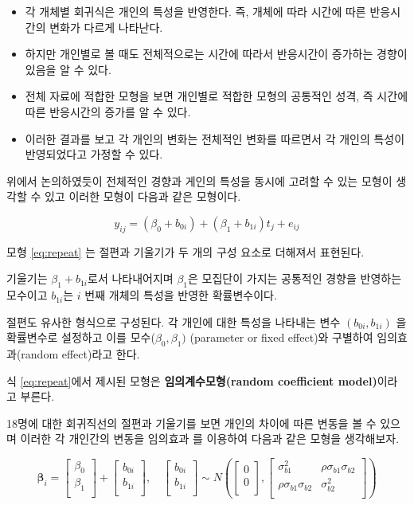 \documentclass[
]{book}
\providecommand{\tightlist}{%
  \setlength{\itemsep}{0pt}\setlength{\parskip}{0pt}}
\newcommand{\bm}[1]{ \symbf{#1}}
\begin{document}
\begin{itemize}
\tightlist
\item
  각 개체별 회귀식은 개인의 특성을 반영한다. 즉, 개체에 따라 시간에 따른 반응시간의 변화가 다르게 나타난다.
\item
  하지만 개인별로 볼 때도 전체적으로는 시간에 따라서 반응시간이 증가하는 경향이 있음을 알 수 있다.
\item
  전체 자료에 적합한 모형을 보면 개인별로 적합한 모형의 공통적인 성격, 즉 시간에 따른 반응시간의 증가를 알 수 있다.
\item
  이러한 결과를 보고 각 개인의 변화는 전체적인 변화를 따르면서 각 개인의 특성이 반영되었다고 가정할 수 있다.
\end{itemize}

위에서 논의하였듯이 전체적인 경향과 게인의 특성을 동시에 고려할 수 있는 모형이 생각할 수 있고 이러한 모형이 다음과 같은 모형이다.

\begin{equation} 
y_{ij} = (\beta_0 + b_{0i}) + (\beta_1 + b_{1i}) t_j + e_{ij} 
\label{eq:repeat}
\end{equation}

모형 \eqref{eq:repeat} 는 절편과 기울기가 두 개의 구성 요소로 더해져서 표현된다.

기울기는 \(\beta_1+b_{1i}\)로서 나타내어지며 \(\beta_1\)은 모집단이 가지는 공통적인 경향을 반영하는 모수이고 \(b_{1i}\)는 \(i\) 번째 개체의 특성을 반영한 확률변수이다.

절편도 유사한 형식으로 구성된다.
각 개인에 대한 특성을 나타내는 변수 \((b_{0i}, b_{1i})\) 을 확률변수로 설정하고 이를 모수(\(\beta_0, \beta_1)\) (parameter or fixed effect)와 구별하여 임의효과(random effect)라고 한다.

식 \eqref{eq:repeat}에서 제시된 모형은 \textbf{임의계수모형(random coefficient model)}이라고 부른다.

18명에 대한 회귀직선의 절편과 기울기를 보면 개인의 차이에 따른 변동을 볼 수 있으며 이러한 각 개인간의 변동을 임의효과 를 이용하여 다음과 같은 모형을 생각해보자.

\[ 
\bm \beta_i=
\begin{bmatrix}
\beta_{0} \\
\beta_{1} \\
\end{bmatrix}
+\begin{bmatrix}
b_{0i} \\
b_{1i} \\
\end{bmatrix}
, \quad
\begin{bmatrix}
b_{0i} \\
b_{1i} \\
\end{bmatrix} \sim
N \left (
\begin{bmatrix}
0 \\
0 \\
\end{bmatrix}
,
\begin{bmatrix}
\sigma^2_{b1} & \rho \sigma_{b1} \sigma_{b2}\\
\rho \sigma_{b1} \sigma_{b2} & \sigma^2_{b2} \\
\end{bmatrix}
\right )
\]
\end{document}
